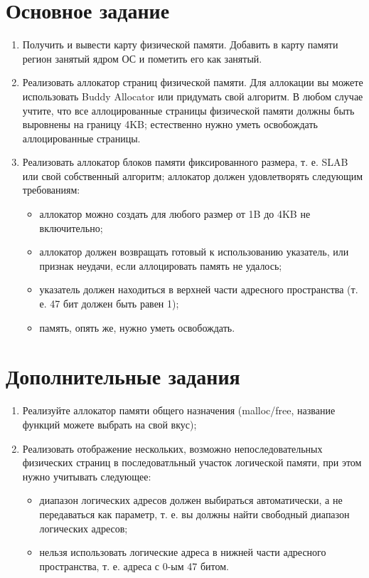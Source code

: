 \section{Основное задание}

\begin{enumerate}
  \item Получить и вывести карту физической памяти. Добавить в карту памяти
  регион занятый ядром ОС и пометить его как занятый.
  \item Реализовать аллокатор страниц физической памяти. Для аллокации вы можете
  использовать Buddy Allocator или придумать свой алгоритм. В любом случае
  учтите, что все аллоцированные страницы физической памяти должны быть
  выровнены на границу 4KB; естественно нужно уметь освобождать аллоцированные
  страницы.
  \item Реализовать аллокатор блоков памяти фиксированного размера, т. е. SLAB
  или свой собственный алгоритм; аллокатор должен удовлетворять следующим
  требованиям:
  \begin{itemize}
    \item аллокатор можно создать для любого размер от 1B до 4KB не
    включительно;
    \item аллокатор должен возвращать готовый к использованию указатель, или
    признак неудачи, если аллоцировать память не удалось;
    \item указатель должен находиться в верхней части адресного пространства (т.
    е. 47 бит должен быть равен 1);
    \item память, опять же, нужно уметь освобождать.
  \end{itemize}
\end{enumerate}

\section{Дополнительные задания}

\begin{enumerate}
  \item Реализуйте аллокатор памяти общего назначения (malloc/free, название
  функций можете выбрать на свой вкус);
  \item Реализовать отображение нескольких, возможно непоследовательных
  физических страниц в последоватльный участок логической памяти, при этом нужно
  учитывать следующее:
  \begin{itemize}
    \item диапазон логических адресов должен выбираться автоматически, а не
    передаваться как параметр, т. е. вы должны найти свободный диапазон
    логических адресов;
    \item нельзя использовать логические адреса в нижней части адресного
    пространства, т. е. адреса с 0-ым 47 битом.
  \end{itemize}
\end{enumerate}
